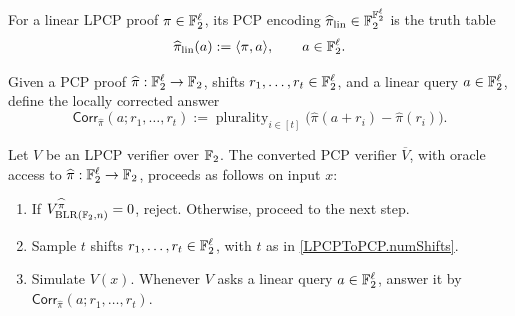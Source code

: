 \begin{definition}
\label{LPCPToPCP.encodedProof}
{}
\leanok
For a linear LPCP proof \(\pi\in\mathbb{F}_2^\ell\), its PCP encoding \(\widehat{\pi}_{\mathrm{lin}} \in \mathbb{F}_2^{\mathbb{F}_2^\ell}\) is the truth
table
\[
  \widehat{\pi}_{\mathrm{lin}}(a) := \langle \pi,a\rangle,
  \qquad a\in\mathbb{F}_2^\ell.
\]
\end{definition}

\begin{definition}
\label{LPCPToPCP.correctedAnswer}
{}
\leanok
Given a PCP proof \(\widehat{\pi}:\mathbb{F}_2^\ell\to\mathbb{F}_2\), shifts
\(r_1,\dots,r_t\in\mathbb{F}_2^\ell\), and a linear query \(a\in\mathbb{F}_2^\ell\), define
the locally corrected answer
\[
  \mathsf{Corr}_{\widehat{\pi}}(a;r_1,\dots,r_t)
  :=
  \operatorname{plurality}_{i\in[t]}
  \bigl(\widehat{\pi}(a+r_i)-\widehat{\pi}(r_i)\bigr).
\]
\end{definition}

\begin{definition}
\label{LPCPToPCP.verifier}
\leanok
Let \(V\) be an LPCP verifier over \(\mathbb{F}_2\). The converted PCP verifier
\(\overline V\), with oracle access to
\(\widehat{\pi}:\mathbb{F}_2^\ell\to\mathbb{F}_2\), proceeds as follows on input \(x\):
\begin{enumerate}
  \item If \(V_{\mathrm{BLR}(\mathbb{F}_{2}, n)}^{\widehat{\pi}}=0\), reject. Otherwise, proceed to the next step.
  \item Sample \(t\) shifts \(r_1,\dots,r_t\in\mathbb{F}_2^\ell\), with \(t\) as in
    \ref{LPCPToPCP.numShifts}.
  \item Simulate \(V(x)\). Whenever \(V\) asks a linear query
    \(a\in\mathbb{F}_2^\ell\), answer it by
    \(\mathsf{Corr}_{\widehat{\pi}}(a;r_1,\dots,r_t)\).
\end{enumerate}
\end{definition}



